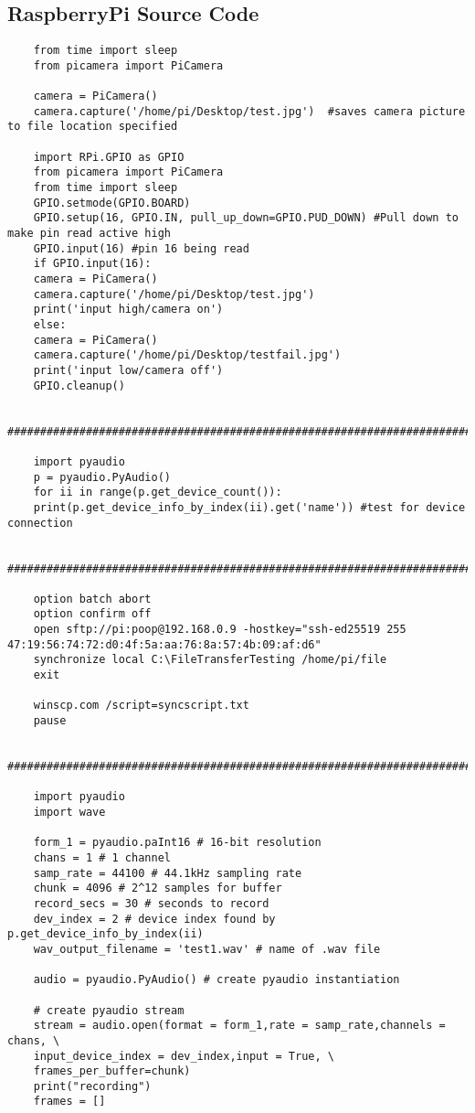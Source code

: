 \subsection{RaspberryPi Source Code}
	\begin{lstlisting}
	from time import sleep
	from picamera import PiCamera
	
	camera = PiCamera()
	camera.capture('/home/pi/Desktop/test.jpg')  #saves camera picture to file location specified
	
	import RPi.GPIO as GPIO
	from picamera import PiCamera
	from time import sleep
	GPIO.setmode(GPIO.BOARD)
	GPIO.setup(16, GPIO.IN, pull_up_down=GPIO.PUD_DOWN) #Pull down to make pin read active high
	GPIO.input(16) #pin 16 being read
	if GPIO.input(16):
	camera = PiCamera()
	camera.capture('/home/pi/Desktop/test.jpg')
	print('input high/camera on')
	else:
	camera = PiCamera()
	camera.capture('/home/pi/Desktop/testfail.jpg')
	print('input low/camera off')
	GPIO.cleanup()
	
	####################################################################################################

	import pyaudio
	p = pyaudio.PyAudio()
	for ii in range(p.get_device_count()):
	print(p.get_device_info_by_index(ii).get('name')) #test for device connection
	
	####################################################################################################
	
	option batch abort
	option confirm off
	open sftp://pi:poop@192.168.0.9 -hostkey="ssh-ed25519 255 47:19:56:74:72:d0:4f:5a:aa:76:8a:57:4b:09:af:d6"
	synchronize local C:\FileTransferTesting /home/pi/file
	exit
	
	winscp.com /script=syncscript.txt
	pause
	
	####################################################################################################
	
	import pyaudio
	import wave
	
	form_1 = pyaudio.paInt16 # 16-bit resolution
	chans = 1 # 1 channel
	samp_rate = 44100 # 44.1kHz sampling rate
	chunk = 4096 # 2^12 samples for buffer
	record_secs = 30 # seconds to record
	dev_index = 2 # device index found by p.get_device_info_by_index(ii)
	wav_output_filename = 'test1.wav' # name of .wav file
	
	audio = pyaudio.PyAudio() # create pyaudio instantiation
	
	# create pyaudio stream
	stream = audio.open(format = form_1,rate = samp_rate,channels = chans, \
	input_device_index = dev_index,input = True, \
	frames_per_buffer=chunk)
	print("recording")
	frames = []
	

\end{lstlisting}
